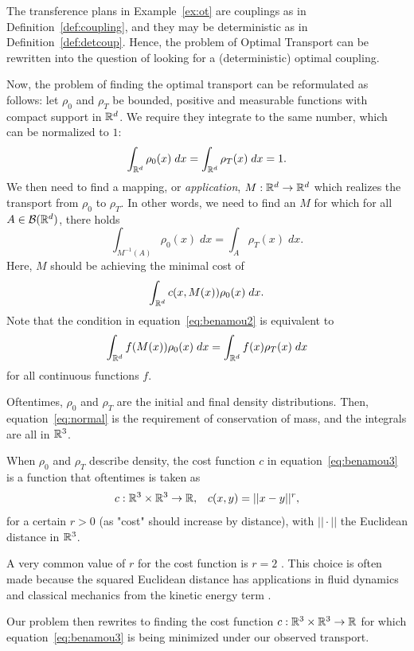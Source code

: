 \vspace{0.3cm}
\begin{remark}
	The transference plans in Example~\ref{ex:ot} are couplings as in Definition~\ref{def:coupling}, and they may be deterministic as in Definition~\ref{def:detcoup}. Hence, the problem of Optimal Transport can be rewritten into the question of looking for a (deterministic) optimal coupling.  
\end{remark}
Now, the problem of finding the optimal transport can be reformulated as follows: let $\rho_0$ and $\rho_T$ be bounded, positive and measurable functions with compact support in $\mathbb{R}^d$. We require they integrate to the same number, which can be normalized to $1$: 
\begin{equation}
	\int_{\mathbb{R}^d} \rho_0(x)\; dx = \int_{\mathbb{R}^d} \rho_T(x) \;  dx = 1. 
	\label{eq:normal}
\end{equation}
We then need to find a mapping, or \textit{application}, $M: \mathbb{R}^d \rightarrow \mathbb{R}^d$ which realizes the transport from $\rho_0$ to $\rho_T$. In other words, we need to find an $M$ for which for all $A \in \mathcal{B}(\mathbb{R}^d)$, there holds 
\begin{equation}
	\int_{M^{-1}(A)} \rho_0(x) \; dx = \int_A \rho_T(x)\; dx.
	\label{eq:benamou2}
\end{equation}
Here, $M$ should be achieving the minimal cost of 
\begin{equation}
	\int_{\mathbb{R}^d} c(x, M(x)) \rho_0(x) \; dx. 
	\label{eq:benamou3}
\end{equation}
Note that the condition in equation~\eqref{eq:benamou2} is equivalent to 
\begin{equation}
	\int_{\mathbb{R}^d} f(M(x)) \rho_0(x) \; dx = \int_{\mathbb{R}^d} f(x)\rho_T(x) \; dx
	\label{eq:equivalence}
\end{equation}
for all continuous functions $f$. 
\vspace{0.3cm}
\begin{example}
	Oftentimes, $\rho_0$ and $\rho_T$ are the initial and final density distributions. Then, equation~\eqref{eq:normal} is the requirement of conservation of mass, and the integrals are all in $\mathbb{R}^3$. \par 
	When $\rho_0$ and $\rho_T$ describe density, the cost function $c$ in equation~\eqref{eq:benamou3} is a function that oftentimes is taken as 
	\begin{equation*}
		c: \mathbb{R}^3 \times \mathbb{R}^3 \rightarrow \mathbb{R}, \;\;\; c(x,y) = ||x - y||^r, \label{eq:benamou4}
	\end{equation*}
	for a certain $r > 0$ (as "cost" should increase by distance), with $||\cdot||$ the Euclidean distance in $\mathbb{R}^3$. \par
	A very common value of $r$ for the cost function is $r=2$ \citep{benamou1998}. This choice is often made because the squared Euclidean distance has applications in fluid dynamics and classical mechanics from the kinetic energy term \citep{benamou2000}. \par 
	Our problem then rewrites to finding the cost function $c: \mathbb{R}^3 \times \mathbb{R}^3 \rightarrow \mathbb{R}$ for which equation~\eqref{eq:benamou3} is being minimized under our observed transport. 
\end{example}

